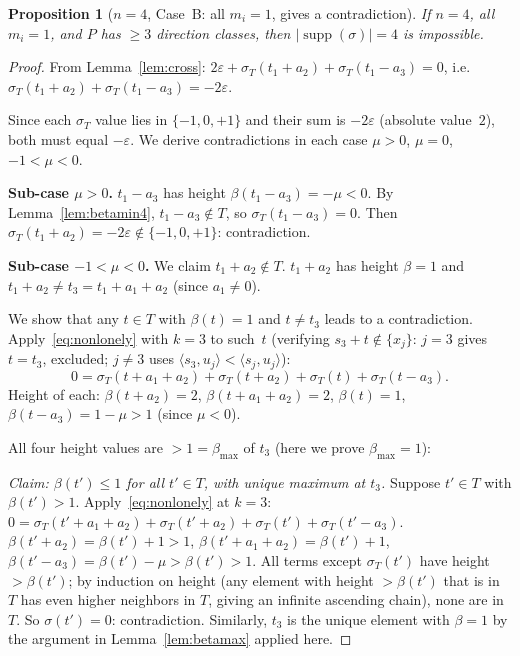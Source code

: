 \documentclass{article}
\newtheorem{prop}{Proposition}
\begin{document}
\begin{prop}[$n=4$, Case~B: all $m_i=1$, gives a contradiction]\label{prop:n4B}
If $n=4$, all $m_i=1$, and $P$ has $\ge 3$ direction classes, then
$|\operatorname{supp}(\sigma)|=4$ is impossible.
\end{prop}
\begin{proof}
From Lemma~\ref{lem:cross}: $2\varepsilon+\sigma_T(t_1+a_2)+\sigma_T(t_1-a_3)=0$,
i.e.\ $\sigma_T(t_1+a_2)+\sigma_T(t_1-a_3)=-2\varepsilon$.

Since each $\sigma_T$ value lies in $\{-1,0,+1\}$ and their sum is $-2\varepsilon$
(absolute value~$2$), both must equal $-\varepsilon$.
We derive contradictions in each case $\mu>0$, $\mu=0$, $-1<\mu<0$.

\medskip
\noindent\textbf{Sub-case $\mu>0$.}
$t_1-a_3$ has height $\beta(t_1-a_3)=-\mu<0$.
By Lemma~\ref{lem:betamin4}, $t_1-a_3\notin T$, so $\sigma_T(t_1-a_3)=0$.
Then $\sigma_T(t_1+a_2)=-2\varepsilon\notin\{-1,0,+1\}$: contradiction.

\medskip
\noindent\textbf{Sub-case $-1<\mu<0$.}
We claim $t_1+a_2\notin T$.
$t_1+a_2$ has height $\beta=1$ and $t_1+a_2\ne t_3=t_1+a_1+a_2$ (since $a_1\ne 0$).

We show that any $t\in T$ with $\beta(t)=1$ and $t\ne t_3$ leads to a contradiction.
Apply~\eqref{eq:nonlonely} with $k=3$ to such~$t$ (verifying $s_3+t\notin\{x_j\}$:
$j=3$ gives $t=t_3$, excluded; $j\ne 3$ uses $\langle s_3,u_j\rangle<\langle s_j,u_j\rangle$):
\[
  0=\sigma_T(t+a_1+a_2)+\sigma_T(t+a_2)+\sigma_T(t)+\sigma_T(t-a_3).
\]
Height of each:
$\beta(t+a_2)=2$, $\beta(t+a_1+a_2)=2$, $\beta(t)=1$, $\beta(t-a_3)=1-\mu>1$ (since $\mu<0$).

All four height values are $>1=\beta_{\max}$ of $t_3$ (here we prove $\beta_{\max}=1$):

\noindent\emph{Claim: $\beta(t')\le 1$ for all $t'\in T$, with unique maximum at $t_3$.}
Suppose $t'\in T$ with $\beta(t')>1$.  Apply~\eqref{eq:nonlonely} at $k=3$:
$0=\sigma_T(t'+a_1+a_2)+\sigma_T(t'+a_2)+\sigma_T(t')+\sigma_T(t'-a_3)$.
$\beta(t'+a_2)=\beta(t')+1>1$, $\beta(t'+a_1+a_2)=\beta(t')+1$, $\beta(t'-a_3)=\beta(t')-\mu>\beta(t')>1$.
All terms except $\sigma_T(t')$ have height $>\beta(t')$; by induction on height
(any element with height $>\beta(t')$ that is in $T$ has even higher neighbors in $T$,
giving an infinite ascending chain), none are in $T$.
So $\sigma(t')=0$: contradiction.  Similarly, $t_3$ is the unique element with $\beta=1$
by the argument in Lemma~\ref{lem:betamax} applied here.


\end{proof}
\end{document}
